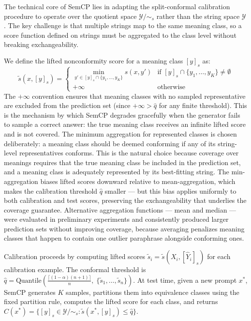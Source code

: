 \documentclass{article}
\begin{document}
\label{sec:calibration_under_the_many_to_one_mappin}

The technical core of SemCP lies in adapting the split-conformal calibration procedure to operate over the quotient space $\mathcal{Y}/{\sim_s}$ rather than the string space $\mathcal{Y}$. The key challenge is that multiple strings map to the same meaning class, so a score function defined on strings must be aggregated to the class level without breaking exchangeability.

We define the lifted nonconformity score for a meaning class $[y]_s$ as:
\begin{equation}
\tilde{s}(x, [y]_s) = \begin{cases} \min_{y' \in [y]_s \cap \{y_1, \ldots, y_K\}} s(x, y') & \text{if } [y]_s \cap \{y_1, \ldots, y_K\} \neq \emptyset \\ +\infty & \text{otherwise} \end{cases}
\end{equation}
The $+\infty$ convention ensures that meaning classes with no sampled representative are excluded from the prediction set (since $+\infty > \hat{q}$ for any finite threshold). This is the mechanism by which SemCP degrades gracefully when the generator fails to sample a correct answer: the true meaning class receives an infinite lifted score and is not covered. The minimum aggregation for represented classes is chosen deliberately: a meaning class should be deemed conforming if any of its string-level representatives conforms. This is the natural choice because coverage over meanings requires that the true meaning class be included in the prediction set, and a meaning class is adequately represented by its best-fitting string. The min-aggregation biases lifted scores downward relative to mean-aggregation, which makes the calibration threshold $\hat{q}$ smaller --- but this bias applies uniformly to both calibration and test scores, preserving the exchangeability that underlies the coverage guarantee. Alternative aggregation functions --- mean and median --- were evaluated in preliminary experiments and consistently produced larger prediction sets without improving coverage, because averaging penalizes meaning classes that happen to contain one outlier paraphrase alongside conforming ones.

Calibration proceeds by computing lifted scores $\tilde{s}_i = \tilde{s}(X_i, [\hat{Y}_i]_s)$ for each calibration example. The conformal threshold is $\hat{q} = \text{Quantile}\!\left(\frac{\lceil(1 - \alpha)(n + 1)\rceil}{n},\; \{\tilde{s}_1, \ldots, \tilde{s}_n\}\right)$. At test time, given a new prompt $x^*$, SemCP generates $K$ samples, partitions them into equivalence classes using the fixed partition rule, computes the lifted score for each class, and returns $C(x^*) = \{[y]_s \in \mathcal{Y}/{\sim_s} : \tilde{s}(x^*, [y]_s) \leq \hat{q}\}$.
\end{document}
